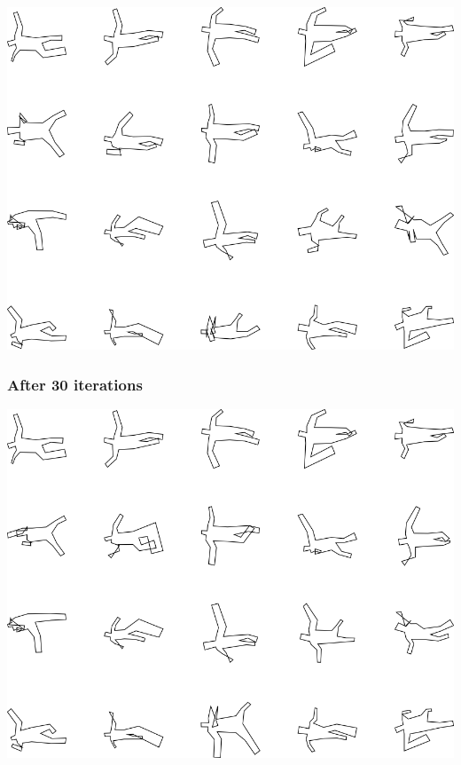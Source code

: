 \includegraphics[width=6in]{output/3.learning/multi_tuning/multi_tuning_iter20_.png}
\subsubsection{After 30 iterations}

\includegraphics[width=6in]{output/3.learning/multi_tuning/multi_tuning_iter30_.png}
